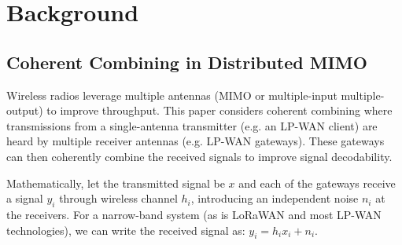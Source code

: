 \section{Background}
\label{sec:background}

\subsection{Coherent Combining in Distributed MIMO}
\label{sec:simo}

Wireless radios leverage multiple antennas (MIMO or multiple-input multiple-output) to improve throughput. This paper considers coherent combining where transmissions from a single-antenna transmitter (e.g. an LP-WAN client) are heard by multiple receiver antennas (e.g. LP-WAN gateways). These gateways can then coherently combine the received signals to improve signal decodability. 




Mathematically, let the transmitted signal be $x$ and each of the gateways receive a signal $y_i$ through wireless channel $h_i$, introducing an independent noise $n_i$ at the receivers. For a narrow-band system (as is LoRaWAN and most LP-WAN technologies), we can write the received signal as: $y_i = h_i x_i + n_i $. 

